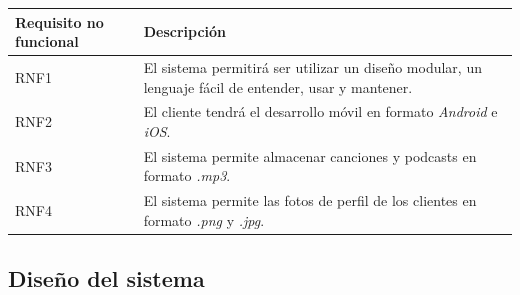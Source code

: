 \documentclass{article}
\begin{document}
\begin{table}[H]
	\begin{tabular}{p{4cm} p{10cm}}
		\hline
		\hline 
		\textbf{Requisito no funcional} & \textbf{Descripción} \\ 
		\hline
		\hline
		RNF1 
		&  El sistema permitirá ser utilizar un diseño modular, un lenguaje fácil de entender, usar y mantener.\\ 
		\hline
		RNF2
		&  El cliente tendrá el desarrollo móvil en formato \textit{Android} e \textit{iOS}.\\ 
		\hline
		RNF3
		& El sistema permite almacenar canciones y podcasts en formato \textit{.mp3}. \\
		\hline
		RNF4
		& El sistema permite las fotos de perfil de los clientes en formato \textit{.png} y \textit{.jpg}. \\
		\hline
	\end{tabular}
\end{table}
\newpage
\subsection{Diseño del sistema}
\end{document}
